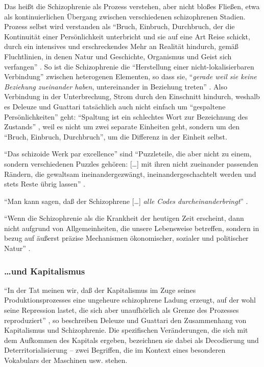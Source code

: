 \documentclass[12pt,
               DIV13,
               paper=a4,
               twoside=false,
               onehalfspacing,
               bibliography=totoc,
               toc=graduated,
               draft,
               ]{scrartcl}
\newcommand{\lips}{\dots\unkern}
\newcommand{\pc}[2]{\parencite[#1]{#2}}
\newcommand{\worries}[1]{\ifdraft{\textcolor{blue}{\texttt{(#1)}}}{}}
\begin{document}
Das heißt die Schizophrenie als Prozess verstehen, aber nicht bloßes
Fließen, etwa als kontinuierlichen Übergang zwischen verschiedenen
schizophrenen Stadien. Prozess selbst wird verstanden als "`Bruch, Einbruch,
Durchbruch, der die Kontinuität einer Persönlichkeit unterbricht und
sie auf eine Art Reise schickt, durch ein intensives und
erschreckendes \glq Mehr an Realität\grq{} hindurch, gemäß
Fluchtlinien, in denen Natur und Geschichte, Organismus und Geist sich
verfangen"' \pc{28}{schizg}. So ist die Schizophrenie die
"`Herstellung einer nicht-lokalisierbaren Verbindung"' \pc{19}{schizg}
zwischen heterogenen Elementen, so dass sie, "`\emph{gerade weil sie
keine Beziehung zueinander haben}, untereinander in Beziehung treten"'
\pc{19}{schizg}. Also Verbindung in der Unterbrechung, Strom durch den
Einschnitt hindurch, weshalb es Deleuze und Guattari tatsächlich auch
nicht einfach um "`gespaltene Persönlichkeiten"' geht: "`Spaltung ist
ein schlechtes Wort zur Bezeichnung des Zustands"' \pc{27}{schizg},
weil es nicht um zwei separate Einheiten geht, sondern um den "`Bruch,
Einbruch, Durchbruch"', um die Differenz in der Einheit selbst.

"`Das schizoide Werk par excellence"' \pc{54}{ao} sind "`Puzzleteile,
die aber nicht zu einem, sondern verschiedenen Puzzles gehören:
[\lips] mit ihren nicht zueinander passenden Rändern, die gewaltsam
ineinandergezwängt, ineinandergeschachtelt werden und stets Reste
übrig lassen"' \pc{54}{ao}.

"`Man kann sagen, daß der Schizophrene [\lips] \emph{alle Codes
durcheinanderbringt}"' \pc{22}{ao}. \worries{?}

"`Wenn die Schizophrenie als die Krankheit der heutigen Zeit
erscheint, dann nicht aufgrund von Allgemeinheiten, die unsere
Lebensweise betreffen, sondern in bezug auf äußerst präzise
Mechanismen ökonomischer, sozialer und politischer Natur"' \pc{28}{schizg}.

\subsubsection{\dots und Kapitalismus}

"`In der Tat meinen wir, daß der Kapitalismus im Zuge seines
Produktionsprozesses eine ungeheure schizophrene Ladung erzeugt, auf
der wohl seine Repression lastet, die sich aber unaufhörlich als
Grenze des Prozesses reproduziert"' \pc{45}{ao}, so beschreiben
Deleuze und Guattari den Zusammenhang von Kapitalismus und
Schizophrenie. Die spezifischen Veränderungen, die sich mit dem
Aufkommen des Kapitals ergeben, bezeichnen sie dabei als Decodierung
und Deterritorialisierung -- zwei Begriffen, die im Kontext eines
besonderen Vokabulars der Maschinen usw. \worries{?} stehen.
\end{document}

